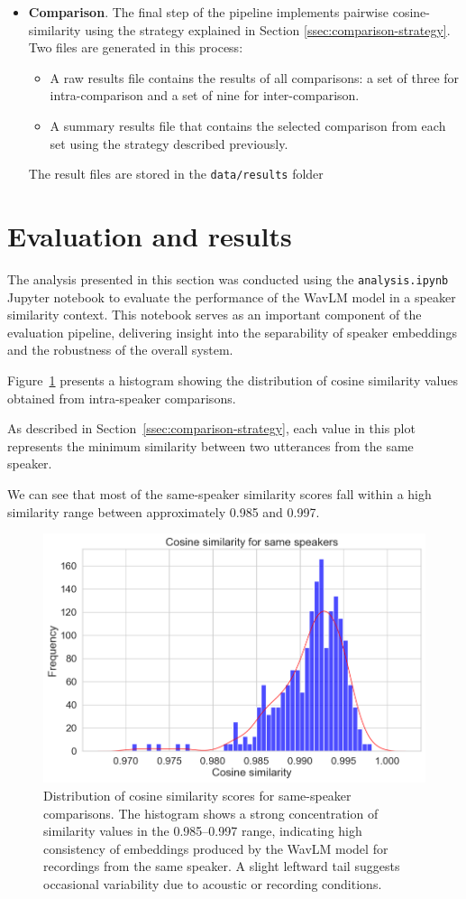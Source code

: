 \documentclass[conference]{IEEEtran}
\begin{document}
\begin{itemize}
	\item \textbf{Comparison}. The final step of the pipeline implements pairwise cosine-similarity using the strategy explained in Section \ref{ssec:comparison-strategy}. Two files are generated in this process:
	\begin{itemize}
		\item A raw results file contains the results of all comparisons: a set of three for intra-comparison and a set of nine for inter-comparison.
		\item A summary results file that contains the selected comparison from each set using the strategy described previously.
	\end{itemize}
	The result files are stored in the \texttt{data/results} folder
\end{itemize}

\section{Evaluation and results}

The analysis presented in this section was conducted using the \texttt{analysis.ipynb} Jupyter notebook to evaluate the performance of the WavLM model in a speaker similarity context. 
This notebook serves as an important component of the evaluation pipeline, delivering insight into the separability of speaker embeddings and the robustness of the overall system.

Figure~\ref{fig:img-self-similarity} presents a histogram showing the distribution of cosine similarity values obtained from intra-speaker comparisons.

As described in Section~\ref{ssec:comparison-strategy}, each value in this plot represents the minimum similarity between two utterances from the same speaker.

We can see that most of the same-speaker similarity scores fall within a high similarity range between approximately 0.985 and 0.997. 

\begin{figure}[H]
	\centering
	\includegraphics[width=0.7\linewidth]{img/img-self-similarity}
	\caption{Distribution of cosine similarity scores for same-speaker comparisons. The histogram shows a strong concentration of similarity values in the 0.985–0.997 range, indicating high consistency of embeddings produced by the WavLM model for recordings from the same speaker. A slight leftward tail suggests occasional variability due to acoustic or recording conditions.}
	\label{fig:img-self-similarity}
\end{figure}
\end{document}

